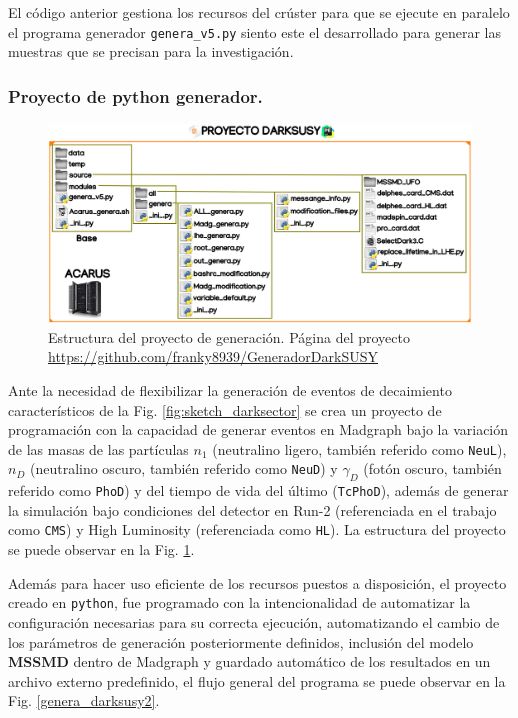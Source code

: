 El código anterior gestiona los recursos del crúster para que se ejecute en paralelo el programa generador \texttt{genera\_v5.py} siento este el desarrollado para generar las muestras que se precisan para la investigación.

\subsubsection{Proyecto de python generador.}
\begin{figure}[h]
\centering
\includegraphics[width=.9\textwidth]{Simulacion/imagenes/proyecto_darksusy.png}
\caption[Estructura del proyecto de generación.]{Estructura del proyecto de generación. Página del proyecto \url{https://github.com/franky8939/GeneradorDarkSUSY}}
\label{genera_darksusy0}
\end{figure}
Ante la necesidad de flexibilizar la generación de eventos de decaimiento característicos de la Fig. \ref{fig:sketch_darksector} se crea un proyecto de programación con la capacidad de generar eventos en Madgraph bajo la variación de las masas de las partículas $n_1$ (neutralino ligero, también referido como \texttt{NeuL}), $n_D$ (neutralino oscuro, también referido como \texttt{NeuD}) y $\gamma_D$ (fotón oscuro, también referido como \texttt{PhoD}) y del tiempo de vida del último (\texttt{TcPhoD}), además de generar la simulación bajo condiciones del detector en Run-2 (referenciada en el trabajo como \texttt{CMS}) y High Luminosity (referenciada como \texttt{HL}). La estructura del proyecto se puede observar en la Fig. \ref{genera_darksusy0}.

Además para hacer uso eficiente de los recursos puestos a disposición, el proyecto creado en \texttt{python}, fue programado con la intencionalidad de automatizar la configuración necesarias para su correcta ejecución, automatizando el cambio de los parámetros de generación posteriormente definidos, inclusión del modelo \textbf{MSSMD} dentro de Madgraph y guardado automático de los resultados en un archivo externo predefinido, el flujo general del programa se puede observar en la Fig. \ref{genera_darksusy2}.

